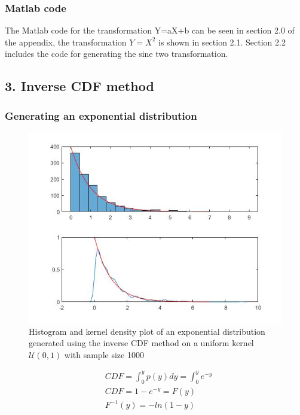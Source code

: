 \documentclass[twoside,twocolumn]{article}
\begin{document}
\subsubsection{Matlab code} %
The Matlab code for the transformation Y=aX+b can be seen in section 2.0 of the appendix, the transformation $Y=X^2$ is shown in section 2.1. Section 2.2 includes the code for generating the sine two transformation.
\subsection{3. Inverse CDF method}
\subsubsection{Generating an exponential distribution}
\begin{figure}[h]
  \centering
    \includegraphics[width=\linewidth]{3exp}
  \caption{Histogram and kernel density plot of an exponential distribution generated using the inverse CDF method on a uniform kernel $\mathcal{U}(0,1)$ with sample size 1000}
  \label{fig:3exp}
\end{figure}
 
\begin{equation}
\label{eq:3cdf}
\begin{split}
&CDF = \int_0^yp(y)dy=\int_0^ye^{-y}\\
&CDF = 1- e^{-y} = F(y)\\
&F^{-1}(y) = -ln(1-y)\\
\end{split}
\end{equation} 
\end{document}
